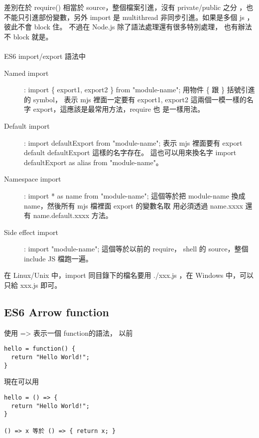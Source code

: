   差別在於 require() 相當於 source，整個檔案引進，沒有 private/public 之分
  ，也不能只引進部份變數，另外 import 是 multithread 非同步引進。如果是多個
  js ，彼此不會 block 住。 不過在 Node.js 除了語法處理還有很多特別處理，
  也有辦法不 block 就是。
  \\\\
  ES6 import/export 語法中
  \begin{description}
    \item[Named import]: import \{ export1, export2 \} from "module-name";
      用物件 \{ 跟 \} 括號引進的 symbol， 表示 mjs 裡面一定要有 export1, 
      export2 這兩個一模一樣的名字 export，這應該是最常用方法，require 也
      是一樣用法。
    \item[Default import]: import defaultExport from "module-name";
      表示 mjs 裡面要有 export default defaultExport 這樣的名字存在。
      這也可以用來換名字 import defaultExport as alias from "module-name"。
    \item[Namespace import]: import * as name from "module-name";
      這個等於把 module-name 換成 name，然後所有 mjs 檔裡面 export 的變數名取
      用必須透過 name.xxxx 還有 name.default.xxxx 方法。
    \item[Side effect import]: import "module-name";
      這個等於以前的 require， shell 的 source，整個 include JS 檔跑一遍。
  \end{description}
  在 Linux/Unix 中，import 同目錄下的檔名要用 ./xxx.js ，在 Windows 中，可以
  只給 xxx.js 即可。

  \subsection{ES6 Arrow function}
  使用 => 表示一個 function的語法， 以前
  \begin{verbatim}
hello = function() {
  return "Hello World!";
}
  \end{verbatim}
  現在可以用
  \begin{verbatim}
hello = () => {
  return "Hello World!";
}

() => x 等於 () => { return x; }
  \end{verbatim}

